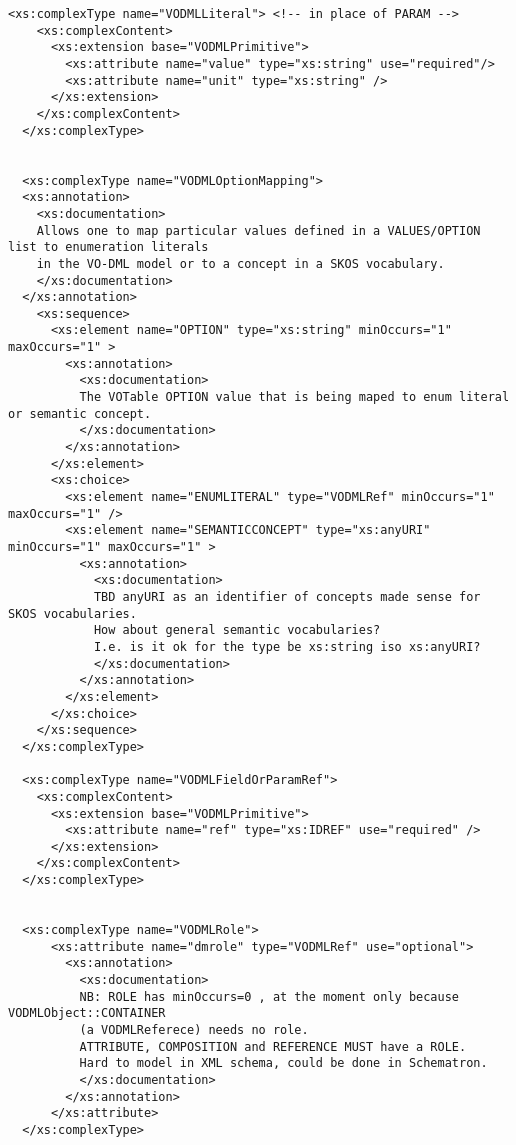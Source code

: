 \documentclass[11pt,a4paper]{ivoa}
\begin{document}
\begin{lstlisting}[label=lst:mapping,caption=VOTable schema extension for VO-DML mapping,frame=tb]
  <xs:complexType name="VODMLLiteral"> <!-- in place of PARAM -->
    <xs:complexContent>
      <xs:extension base="VODMLPrimitive">
        <xs:attribute name="value" type="xs:string" use="required"/>
        <xs:attribute name="unit" type="xs:string" />
      </xs:extension>
    </xs:complexContent>
  </xs:complexType>
  
  
  <xs:complexType name="VODMLOptionMapping">
  <xs:annotation>
    <xs:documentation>
    Allows one to map particular values defined in a VALUES/OPTION list to enumeration literals
    in the VO-DML model or to a concept in a SKOS vocabulary.
    </xs:documentation>
  </xs:annotation>
    <xs:sequence>
      <xs:element name="OPTION" type="xs:string" minOccurs="1" maxOccurs="1" >
        <xs:annotation>
          <xs:documentation>
          The VOTable OPTION value that is being maped to enum literal or semantic concept.
          </xs:documentation>
        </xs:annotation>
      </xs:element>
      <xs:choice>
        <xs:element name="ENUMLITERAL" type="VODMLRef" minOccurs="1" maxOccurs="1" />
        <xs:element name="SEMANTICCONCEPT" type="xs:anyURI" minOccurs="1" maxOccurs="1" >
          <xs:annotation>
            <xs:documentation>
            TBD anyURI as an identifier of concepts made sense for SKOS vocabularies. 
            How about general semantic vocabularies?
            I.e. is it ok for the type be xs:string iso xs:anyURI?
            </xs:documentation>
          </xs:annotation>
        </xs:element>
      </xs:choice>
    </xs:sequence>
  </xs:complexType>
  
  <xs:complexType name="VODMLFieldOrParamRef">
    <xs:complexContent>
      <xs:extension base="VODMLPrimitive">
        <xs:attribute name="ref" type="xs:IDREF" use="required" />
      </xs:extension>
    </xs:complexContent>
  </xs:complexType>


  <xs:complexType name="VODMLRole">
      <xs:attribute name="dmrole" type="VODMLRef" use="optional">
        <xs:annotation>
          <xs:documentation>
          NB: ROLE has minOccurs=0 , at the moment only because VODMLObject::CONTAINER 
          (a VODMLReferece) needs no role.
          ATTRIBUTE, COMPOSITION and REFERENCE MUST have a ROLE.
          Hard to model in XML schema, could be done in Schematron.
          </xs:documentation>
        </xs:annotation>
      </xs:attribute>
  </xs:complexType>


\end{lstlisting}
\end{document}
